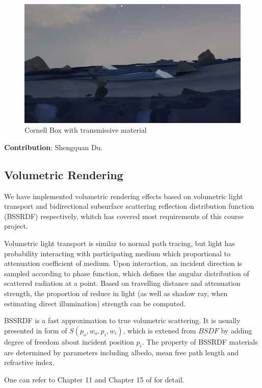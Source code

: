 \documentclass[acmtog]{acmart}
\begin{document}
\begin{figure}[h]
	\centering	
	\includegraphics[width=\linewidth]{sea}
	\caption{Cornell Box with transmissive material}
	\label{sea}
\end{figure}

\noindent \textbf{Contribution}: Shengquan Du.

\subsection{Volumetric Rendering}

We have implemented volumetric rendering effects based on volumetric light transport and bidirectional subsurface scattering reflection distribution function (BSSRDF) respectively, whitch has covered most requirements of this course project.

Volumetric light transport is similar to normal path tracing, but light has probability interacting with participating medium which proportional to attenuation coefficient of medium. Upon interaction, an incident direction is sampled according to phase function, which defines the angular distribution of scattered radiation at a point. Based on travelling distance and attenuation strength, the proportion of reduce in light (as well as shadow ray, when estimating direct illumination) strength can be computed. 

BSSRDF is a fast approximation to true volumetric scattering. It is usually presented in form of $S(p_o, w_o, p_i, w_i)$, which is extened from $BSDF$ by adding degree of freedom about incident position $p_i$. The property of BSSRDF materials are determined by parameters including albedo, mean free path length and refractive index. 

One can refer to Chapter 11 and Chapter 15 of \cite{pbr3rd} for detail.
\end{document}
